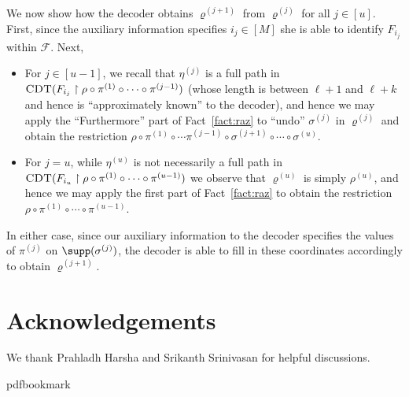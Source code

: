 \documentclass[11pt]{article}
\numberwithin{equation}{section}
\theoremstyle{definition}
\theoremstyle{plain}
\theoremstyle{plain}
\newcommand{\uhr}{\upharpoonright}
\newcommand{\CDT}{\textsc{CDT}}
\begin{document}
We now show how the decoder obtains $\varrho^{(j+1)}$ from $\varrho^{(j)}$ for all $j \in [u]$. First, since the auxiliary information specifies $i_j \in [M]$ she is able to identify $F_{i_j}$ within $\mathscr{F}$. Next, 
\begin{itemize}

\item For $j\in [u-1]$, we recall that $\eta^{(j)}$ is a full path in $\CDT(F_{i_j} \uhr \rho\circ \pi^{(1)} \circ \cdots \circ \pi^{(j-1)})$ (whose length is between $\ell+1$ and $\ell+k$ and hence is ``approximately known'' to the decoder), and hence we may apply the ``Furthermore'' part of Fact~\ref{fact:raz} to ``undo'' $\sigma^{(j)}$ in $\varrho^{(j)}$ and obtain the restriction $\rho \circ \pi^{(1)} \circ \cdots \pi^{(j-1)} \circ \sigma^{(j+1)}\circ \cdots \circ \sigma^{(u)}$.  


\item For $j=u$, while $\eta^{(u)}$ is not necessarily a full path in $\CDT(F_{i_u} \uhr \rho\circ \pi^{(1)}\circ \cdots \circ \pi^{(u-1)})$ we observe that $\varrho^{(u)}$ is simply $\rho^{(u)}$, and hence we may apply the first part of Fact~\ref{fact:raz} to obtain the restriction $\rho\circ\pi^{(1)}\circ\cdots \circ \pi^{(u-1)}$. 
\end{itemize}

In either case, since our auxiliary information to the decoder specifies the values of $\pi^{(j)}$ on $\supp(\sigma^{(j)})$, the decoder is able to fill in these coordinates accordingly to obtain $\varrho^{(j+1)}$. 

\section*{Acknowledgements} 

We thank Prahladh Harsha and Srikanth Srinivasan for helpful discussions.

%

\newcommand{\prelim}{Preliminary version in\ }\newcommand{\prelims}{Preliminary
  versions in\ }
\providecommand{\bibhead}[1]{}
\expandafter\ifx\csname pdfbookmark\endcsname\relax%
  \providecommand{\tocrefpdfbookmark}{}
\else\providecommand{\tocrefpdfbookmark}{%
   \hypertarget{tocreferences}{}%
   \pdfbookmark[1]{References}{tocreferences}}%
\fi
\end{document}

